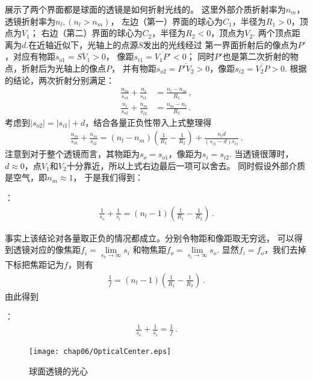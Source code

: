 展示了两个界面都是球面的透镜是如何折射光线的。
这里外部介质折射率为$n_m$，透镜折射率为$n_l, (n_l>n_m)$，
左边（第一）界面的球心为$C_1$，半径为$R_1>0$，顶点为$V_1$；
右边（第二）界面的球心为$C_2$，半径为$R_2<0$，顶点为$V_2$.
两个顶点距离为$d$.在近轴近似下，光轴上的点源$S$发出的光线经过
第一界面折射后的像点为$P'$，对应有物距$s_{o1}=\overline{SV_1}>0$，
像距$s_{i1}=\overline{V_1P'}<0$；
同时$P'$也是第二次折射的物点，折射后为光轴上的像点$P$，
并有物距$s_{o2}=\overline{P'V_2}>0$，像距$s_{i2}=\overline{V_2P}>0$.
根据的结论，两次折射分别满足：
\begin{align}
    \frac{n_m}{s_{o1}}+\frac{n_l}{s_{i1}} & =\frac{n_l-n_m}{R_1}\, , \\
    \frac{n_l}{s_{o2}}+\frac{n_m}{s_{i2}} & =\frac{n_m-n_l}{R_2}\, .
\end{align}
考虑到$|s_{o2}|=|s_{i1}|+d$，结合各量正负性带入上式整理得
\begin{align}
    \frac{n_m}{s_{o1}}+\frac{n_m}{s_{i2}}=(n_l-n_m)\left(\frac{1}{R_1}-\frac{1}{R_2}\right)+\frac{n_ld}{(s_{i1}-d)s_{i1}}\, .
\end{align}
注意到对于整个透镜而言，其物距为$s_o=s_{o1}$，像距为$s_i=s_{i2}$.
当透镜很薄时，$d\approx 0$，点$V_1$和$V_2$十分靠近，所以上式右边最后一项可以舍去。
同时假设外部介质是空气，即$n_m\approx 1$，
于是我们得到：
\begin{proposition}
    ：
    \begin{align}
        \frac{1}{s_o}+\frac{1}{s_i}=(n_l-1)\left(\frac{1}{R_1}-\frac{1}{R_2}\right)\, .
    \end{align}
\end{proposition}

事实上该结论对各量取正负的情况都成立。分别令物距和像距取无穷远，
可以得到透镜对应的像焦距$f_i=\lim\limits_{s_o\to\infty}s_i$
和物焦距$f_o=\lim\limits_{s_i\to\infty}s_o$.
显然$f_i=f_o$，我们去掉下标把焦距记为$f$，则有
\begin{align}
    \frac{1}{f}=(n_l-1)\left(\frac{1}{R_1}-\frac{1}{R_2}\right)\, .
\end{align}
由此得到
\begin{proposition}
    ：
    \begin{align}
        \frac{1}{s_o}+\frac{1}{s_i}=\frac{1}{f}\, .
    \end{align}
\end{proposition}

\begin{figure}[htbp]
    \centering\texttt{[image: chap06/OpticalCenter.eps]}
    \caption{球面透镜的光心}
    \label{fig:6.35}
\end{figure}

